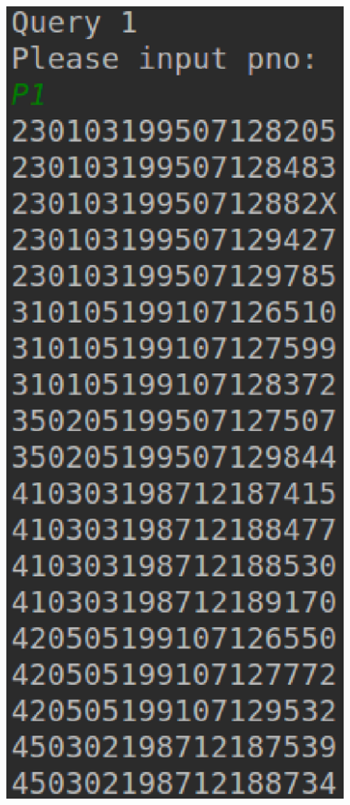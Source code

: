 \documentclass{ML}
\begin{document}
\begin{enumerate}
\begin{figure}[htb]
        \includegraphics[scale=0.5, bb=0 0 217 485]{media/3.1.eps}
    \end{figure}
        
\end{enumerate}
\end{document}
